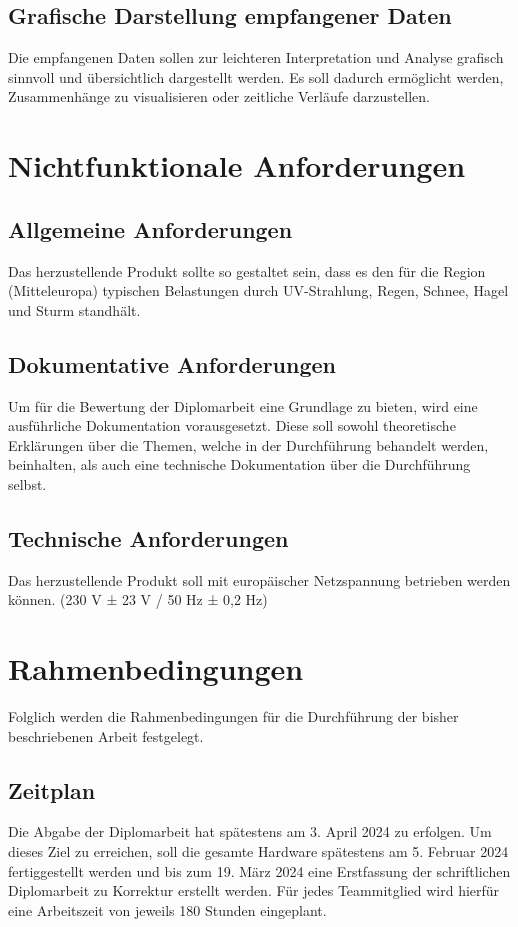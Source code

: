 \subsection{Grafische Darstellung empfangener Daten}
Die empfangenen Daten sollen zur leichteren Interpretation und Analyse grafisch sinnvoll und übersichtlich dargestellt werden. Es soll dadurch ermöglicht werden, Zusammenhänge zu visualisieren oder zeitliche Verläufe darzustellen.\\

\section{Nichtfunktionale Anforderungen}
\subsection{Allgemeine Anforderungen}
Das herzustellende Produkt sollte so gestaltet sein, dass es den für die Region (Mitteleuropa) typischen 
Belastungen durch UV-Strahlung, Regen, Schnee, Hagel und Sturm standhält.\\ 

\subsection{Dokumentative Anforderungen}
Um für die Bewertung der Diplomarbeit eine Grundlage zu bieten, wird eine ausführliche 
Dokumentation vorausgesetzt. Diese soll sowohl theoretische Erklärungen über die Themen, welche 
in der Durchführung behandelt werden, beinhalten, als auch eine technische Dokumentation über die 
Durchführung selbst.\\

\subsection{Technische Anforderungen}
Das herzustellende Produkt soll mit europäischer Netzspannung betrieben werden können. (230 V 
± 23 V / 50 Hz ± 0,2 Hz)\\

\section{Rahmenbedingungen}
Folglich werden die Rahmenbedingungen für die Durchführung der bisher beschriebenen 
Arbeit festgelegt.\\

\subsection{Zeitplan}
Die Abgabe der Diplomarbeit hat spätestens am 3. April 2024 zu erfolgen. Um dieses Ziel zu 
erreichen, soll die gesamte Hardware spätestens am 5. Februar 2024 fertiggestellt werden und bis 
zum 19. März 2024 eine Erstfassung der schriftlichen Diplomarbeit zu Korrektur erstellt werden. Für 
jedes Teammitglied wird hierfür eine Arbeitszeit von jeweils 180 Stunden eingeplant.\\

